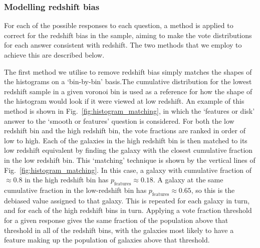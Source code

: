 \documentclass[useAMS,usenatbib]{mn2e}
\begin{document}
\subsubsection{Modelling redshift bias}
\label{sec:debiasing}

For each of the possible responses to each question, a method is applied to correct for the redshift bias in the sample, aiming to make the vote distributions for each answer consistent with redshift. The two methods that we employ to achieve this are described below. 

The first method we utilise to remove redshift bias simply matches the shapes of the histograms on a `bin-by-bin' basis.The cumulative distribution for the lowest redshift sample in a given voronoi bin is used as a reference for how the shape of the histogram would look if it were viewed at low redshift. An example of this method is shown in Fig.~\ref{fig:histogram_matching}, in which the `features or disk' answer to the `smooth or features' question is considered. For both the low redshift bin and the high redshift bin, the vote fractions are ranked in order of low to high. Each of the galaxies in the high redshift bin is then matched to its low redshift equivalent by finding the galaxy with the closest cumulative fraction in the low redshift bin. This `matching' technique is shown by the vertical lines of Fig.~\ref{fig:histogram_matching}. In this case, a galaxy with cumulative fraction of $\approx 0.8$ in the high redshift bin has $p_{\mathrm{features}} \approx 0.18$. A galaxy at the same cumulative fraction in the low-redshift bin has $p_{\mathrm{features}} \approx 0.65$, so this is the debiased value assigned to that galaxy. This is repeated for each galaxy in turn, and for each of the high redshift bins in turn. Applying a vote fraction threshold for a given response gives the same fraction of the population above that threshold in all of the redshift bins, with the galaxies most likely to have a feature making up the population of galaxies above that threshold. 
\end{document}
